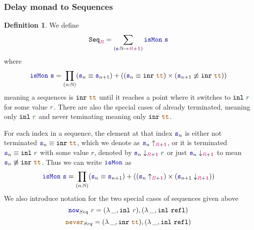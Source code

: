 \documentclass[twoside,11pt,openright]{report}
\theoremstyle{plain} %
\theoremstyle{definition}
\newtheorem{defn}{Definition}[section]
\theoremstyle{remark}
\newcommand*{\term}[1]{\textcolor{green!30!black}{#1}} %
\newcommand*{\type}[1]{\textcolor{magenta!90!black}{#1}}
\newcommand*{\unit}{\type{\textbf{1}}}
\newcommand*{\constant}[1]{\textcolor{orange!60!black}{\ensuremath{\mathtt{#1}}}}
\newcommand*{\function}[1]{\textcolor{blue!60!black}{\ensuremath{\mathtt{#1}}}}
\newcommand*{\typeformer}[1]{\ensuremath{\mathtt{#1}}}
\begin{document}
\subsubsection{Delay monad to Sequences}
\begin{defn}
  We define
  \begin{equation}
    \typeformer{Seq}_{\type{R}} = \sum_{(\function{s} : \mathbb{N} \rightarrow \type{R} + \unit)} \function{isMon}~\function{s}
  \end{equation}
  where
  \begin{equation}
    \function{isMon}~\function{s} = \prod_{(n : \mathbb{N})} (\function{s}_n \equiv \function{s}_{n+1})  + ((\function{s}_n \equiv \mathtt{inr}~\constant{tt}) \times (\function{s}_{n+1} \not\equiv \mathtt{inr}~\constant{tt}))
  \end{equation}
  meaning a sequences is \(\mathtt{inr}~\constant{tt}\) until it reaches a point where it switches to \(\mathtt{inl}~\term{r}\) for some value \(\term{r}\). There are also the special cases of already terminated, meaning only \(\mathtt{inl}~\term{r}\) and never teminating meaning only \(\mathtt{inr}~\constant{tt}\).
\end{defn}
\noindent For each index in a sequence, the element at that index \(\function{s}_n\) is either not terminated \(\function{s}_n \equiv \mathtt{inr}~\constant{tt}\), which we denote as \(\function{s}_n \uparrow_{\type{R} + \unit}\), or it is terminated \(\function{s}_n \equiv \mathtt{inl}~\term{r}\) with some value \(r\), denoted by \(\function{s}_n \downarrow_{\type{R} + \unit} \term{r}\) or just \(\function{s}_n \downarrow_{\type{R} + \unit}\) to mean \(\function{s}_n \not\equiv \mathtt{inr}~\constant{tt}\). Thus we can write \(\function{isMon}\) as
\begin{equation}
  \function{isMon}~\function{s} = \prod_{(n : \mathbb{N})} (\function{s}_n \equiv \function{s}_{n+1})  + ((\function{s}_n \uparrow_{\type{R} + \unit}) \times (\function{s}_{n+1} \downarrow_{\type{R} + \unit}))
\end{equation}
We also introduce notation for the two special cases of sequences given above
\begin{equation}
  \function{now}_{Seq}~\term{r} = (\lambda\,\_, \mathtt{inl}~\term{r}) , (\lambda\,\_, \mathtt{inl}~\mathtt{refl})
\end{equation}
\begin{equation}
  \constant{never}_{Seq} = (\lambda\,\_, \mathtt{inr}~\constant{tt}) , (\lambda\,\_, \mathtt{inl}~\mathtt{refl})
\end{equation}
\end{document}
